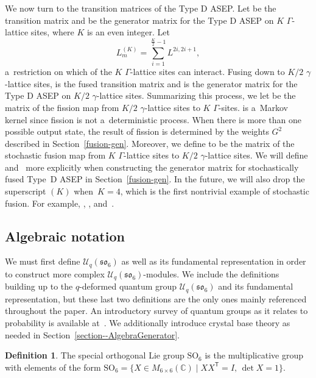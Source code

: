 \documentclass[pdftex]{sigma}
\numberwithin{equation}{section}
\theoremstyle{definition}
\newtheorem{Definition}[Theorem]{Definition}
\begin{document}
We now turn to the transition matrices of the Type D ASEP. Let  be the transition matrix and  be the generator matrix for the Type D ASEP on $K$ $\Gamma$-lattice sites, where $K$ is an even integer. Let
\[
L^{(K)}_m = \sum_{i=1}^{\frac{K}{2}-1} L^{2i,2i+1},
\]
 a~restriction on which of the $K$ $\Gamma$-lattice sites can interact. Fusing down to $K/2$ $\gamma$-lattice sites,  is the fused transition matrix and  is the generator matrix for the Type D ASEP on $K/2$ $\gamma$-lattice sites. Summarizing this process, we let  be the matrix of the fission map from $K/2$ $\gamma$-lattice sites to $K$ $\Gamma$-sites.  is a~Markov kernel since fission is not a~deterministic process. When there is more than one possible output state, the result of fission is determined by the weights $G^2$ described in Section~\ref{fusion-gen}. Moreover, we define  to be the matrix of the stochastic fusion map from $K$ $\Gamma$-lattice sites to $K/2$ $\gamma$-lattice sites. We will define  and~ more explicitly when constructing the generator matrix for stochastically fused Type~D ASEP in Section~\ref{fusion-gen}. In the future, we will also drop the superscript $(K)$ when~${K = 4}$, which is the first nontrivial example of stochastic fusion. For example, , , and~.

\subsection{Algebraic notation} \label{algebra_defns}
We must first define $\mathcal{U}_q(\mathfrak{so}_6)$ as well as its fundamental representation in order to construct more complex $\mathcal{U}_q(\mathfrak{so}_6)$-modules. We include the definitions building up to the $q$-deformed quantum group $\mathcal{U}_q(\mathfrak{so}_6)$ and its fundamental representation, but these last two definitions are the only ones mainly referenced throughout the paper. An introductory survey of quantum groups as it relates to probability is available at~\cite{KuanQuantum}. We additionally introduce crystal base theory as needed in Section~\ref{section--AlgebraGenerator}.
\begin{Definition}
 The special orthogonal Lie group ${\mathrm{SO}}_{6}$ is the multiplicative group with elements of the form ${\mathrm{SO}}_{6} = \bigl\{ X \in M_{6 \times 6} (\mathbb{C})\mid XX^{\mathsf{T}} = I,\, \det X = 1\bigr\}$.
\end{Definition}
\end{document}
